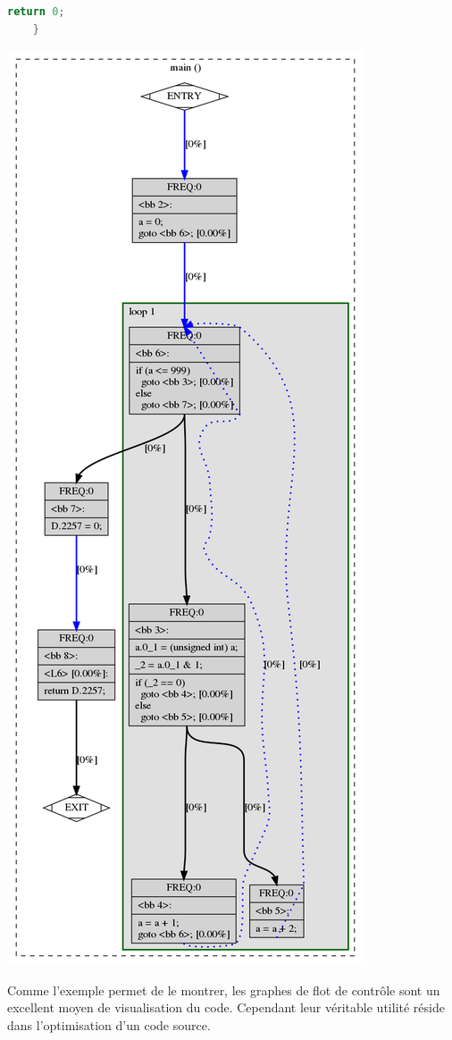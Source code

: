 \begin{multicols}{2}
\begin{lstlisting}[language=c, caption={Exemple de programme pour construire un CFG}, captionpos=b]
        return 0;
    }
\end{lstlisting}
\begin{center}
    \includegraphics[scale=0.22]{images/graph.png}
\end{center}
\end{multicols}
Comme l'exemple permet de le montrer, les graphes de flot de contrôle sont un excellent moyen de visualisation du code. Cependant leur véritable utilité réside dans l'optimisation d'un code source.
